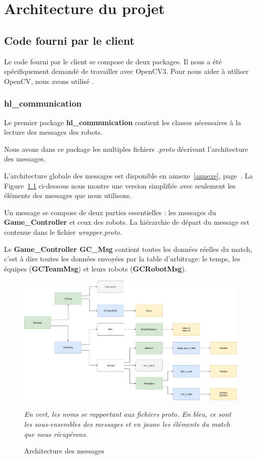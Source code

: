 
\chapter{Architecture du projet}

   
\section{Code fourni par le client}

Le code fourni par le client se compose de deux packages. Il 
nous a été spécifiquement demandé de travailler avec OpenCV3. 
Pour nous aider à utiliser OpenCV, nous avons utilisé 
\cite{ref3}.

\subsection{hl\_communication}

Le premier package \textbf{hl\_communication} contient les 
classes nécessaires à la lecture des messages des robots.
\bigskip

Nous avons dans ce package les multiples fichiers 
\textit{.proto} décrivant l'architecture des messages. 

L'architecture globale des messages est disponible en 
annexe~\ref{annexe}, page~\pageref{annexe}. La 
Figure~\ref{fig:message} ci-dessous nous montre une version 
simplifiée avec seulement les éléments des messages que nous 
utilisons.
\bigskip

Un message se compose de deux parties essentielles : les 
messages du \textbf{Game\_Controller} et ceux des robots. La 
hiérarchie de départ du message est contenue dans le fichier 
\textit{wrapper.proto}.
\bigskip

Le \textbf{Game\_Controller GC\_Msg} contient toutes les 
données réelles du match, c'est à dire toutes les données 
envoyées par la table d'arbitrage: le temps, les équipes 
(\textbf{GCTeamMsg}) et leurs robots (\textbf{GCRobotMsg}). 
\bigskip



\begin{figure}[H] 
\centering 
\includegraphics[scale = 0.24]{images/shortmessage.png}
    \caption{Architecture des messages}
    \label{fig:message}
    {\textit{En vert, les noms se rapportant aux fichiers
    proto. En bleu, ce sont les sous-ensembles des messages et
    en jaune les éléments du match que nous récupérons. }}
\end{figure} 


